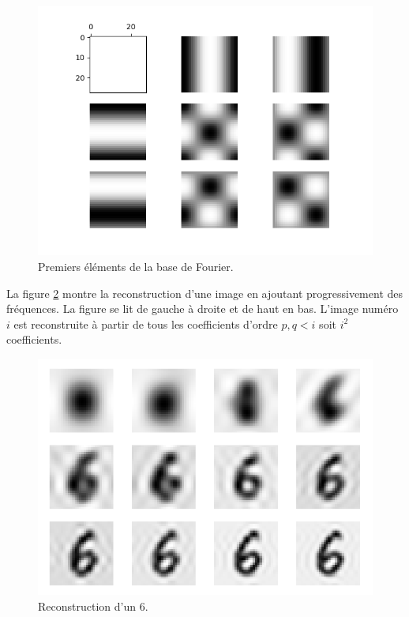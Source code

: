 \begin{figure}[h]
  \centering
  \includegraphics[scale=0.6]{assets/fft-basis}
  \caption{Premiers éléments de la base de Fourier.}
  \label{fig:freq-basis}
\end{figure}

La figure \ref{fig:fft-image-reconstruction} montre la reconstruction d'une 
image en ajoutant progressivement des fréquences.
La figure se lit de gauche à droite et de haut en bas. 
L'image numéro $i$ est reconstruite à partir de tous les coefficients 
d'ordre $p,q < i$ soit $i^2$ coefficients.

\begin{figure}[h]
  \centering
  \includegraphics[scale=0.6]{assets/fft-image-num62-reconstruction}
  \caption{Reconstruction d'un $6$.}
  \label{fig:fft-image-reconstruction}
\end{figure}





